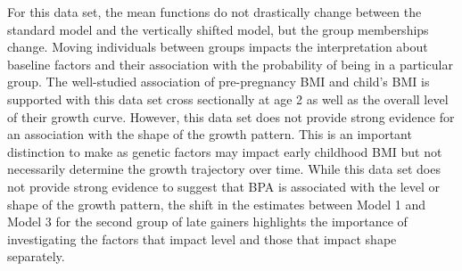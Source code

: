 For this data set, the mean functions do not drastically change between the standard model and the vertically shifted model, but the group memberships change. Moving individuals between groups impacts the interpretation about baseline factors and their association with the probability of being in a particular group. The well-studied association of pre-pregnancy BMI and child's BMI \cite{whitaker1997} is supported with this data set cross sectionally at age 2 as well as the overall level of their growth curve. However, this data set does not provide strong evidence for an association with the shape of the growth pattern. This is an important distinction to make as genetic factors may impact early childhood BMI but not necessarily determine the growth trajectory over time. While this data set does not provide strong evidence to suggest that BPA is associated with the level or shape of the growth pattern, the shift in the estimates between Model 1 and Model 3 for the second group of late gainers highlights the importance of investigating the factors that impact level and those that impact shape separately.
